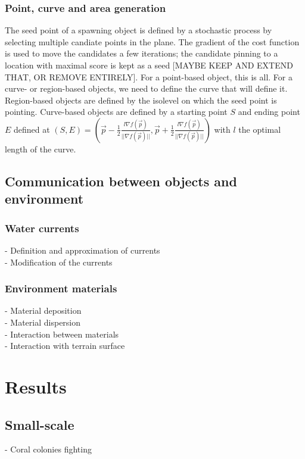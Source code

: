 \documentclass{egpubl}
\newcommand{\point}[1]{\vec{#1}}
\begin{document}
\subsubsection{Point, curve and area generation}
The seed point of a spawning object is defined by a stochastic process by selecting multiple candiate points in the plane. The gradient of the cost function is used to move the candidates a few iterations; the candidate pinning to a location with maximal score is kept as a seed [MAYBE KEEP AND EXTEND THAT, OR REMOVE ENTIRELY]. For a point-based object, this is all. For a curve- or region-based objects, we need to define the curve that will define it. 
Region-based objects are defined by the isolevel on which the seed point is pointing.
Curve-based objects are defined by a starting point $S$ and ending point $E$ defined at $(S, E) = \left(\point{p} - \frac{1}{2}\frac{l \nabla f(\point{p})}{||\nabla f(\point{p})||}, \point{p} + \frac{1}{2}\frac{l \nabla f(\point{p})}{||\nabla f(\point{p})||} \right)$  with $l$ the optimal length of the curve.

\subsection{Communication between objects and environment}
\subsubsection{Water currents}
- Definition and approximation of currents \\
- Modification of the currents \\

\subsubsection{Environment materials}
- Material deposition \\
- Material dispersion \\
- Interaction between materials \\
- Interaction with terrain surface \\


\section{Results}
\subsection{Small-scale}
- Coral colonies fighting \\
\end{document}

